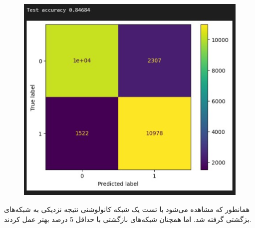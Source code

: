 \documentclass{article}
\begin{document}
\begin{figure}[!h]
    \centering\includegraphics[scale=.70]{./test-cnn}
    \caption{}\label{fig.53}
\end{figure}



\cleardoublepage

همانطور که مشاهده می‌شود با تست یک شبکه کانولوشنی نتیجه نزدیکی به شبکه‌های بزگشتی گرفته شد. اما همچنان شبکه‌های بازگشتی با حداقل 5 درصد بهتر عمل کردند.


\end{document}
